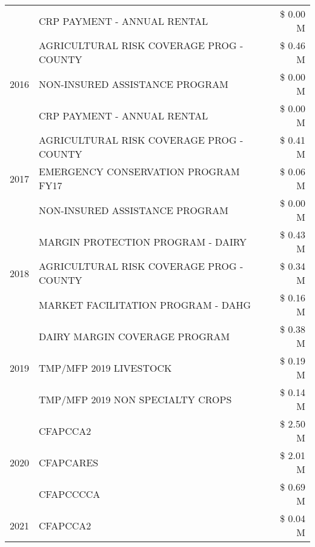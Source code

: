 \begin{tabular}{llr}
 & CRP PAYMENT - ANNUAL RENTAL & \$ 0.00 M \\
\cline{1-3}
\multirow[t]{3}{*}{2016} & AGRICULTURAL RISK COVERAGE PROG - COUNTY & \$ 0.46 M \\
 & NON-INSURED ASSISTANCE PROGRAM & \$ 0.00 M \\
 & CRP PAYMENT - ANNUAL RENTAL & \$ 0.00 M \\
\cline{1-3}
\multirow[t]{3}{*}{2017} & AGRICULTURAL RISK COVERAGE PROG - COUNTY & \$ 0.41 M \\
 & EMERGENCY CONSERVATION PROGRAM FY17 & \$ 0.06 M \\
 & NON-INSURED ASSISTANCE PROGRAM & \$ 0.00 M \\
\cline{1-3}
\multirow[t]{3}{*}{2018} & MARGIN PROTECTION PROGRAM - DAIRY & \$ 0.43 M \\
 & AGRICULTURAL RISK COVERAGE PROG - COUNTY & \$ 0.34 M \\
 & MARKET FACILITATION PROGRAM - DAHG & \$ 0.16 M \\
\cline{1-3}
\multirow[t]{3}{*}{2019} & DAIRY MARGIN COVERAGE PROGRAM & \$ 0.38 M \\
 & TMP/MFP 2019 LIVESTOCK & \$ 0.19 M \\
 & TMP/MFP 2019 NON SPECIALTY CROPS & \$ 0.14 M \\
\cline{1-3}
\multirow[t]{3}{*}{2020} & CFAPCCA2 & \$ 2.50 M \\
 & CFAPCARES & \$ 2.01 M \\
 & CFAPCCCCA & \$ 0.69 M \\
\cline{1-3}
2021 & CFAPCCA2 & \$ 0.04 M \\
\cline{1-3}
\bottomrule
\end{tabular}
